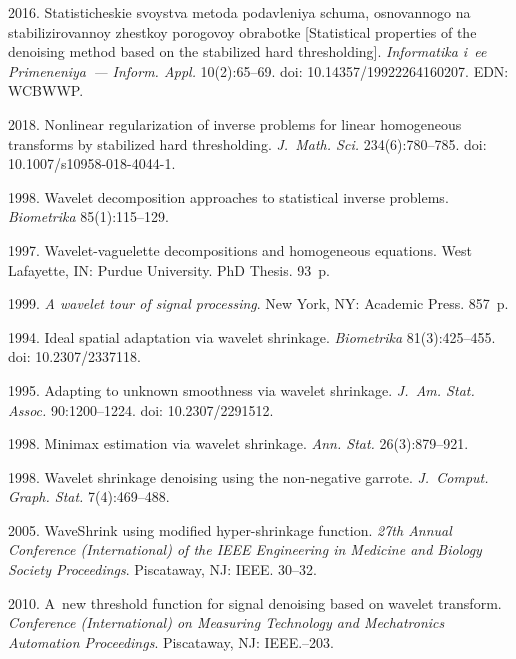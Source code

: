 \begin{multicols}{2}
{{\begin{thebibliography}{99}
 2016. Statisticheskie svoystva metoda podavleniya schuma, osnovannogo na stabilizirovannoy zhest\-koy porogovoy obrabotke 
 [Statistical properties of the denoising method based on the stabilized hard thresholding]. 
 \textit{Informatika i~ee Primeneniya~--- Inform. Appl.} 10(2):65--69. 
doi: 10.14357/19922264160207. EDN: WCBWWP.

 2018. Nonlinear regularization of inverse problems for linear homogeneous transforms by stabilized hard thresholding. 
 \textit{J.~Math. Sci.} 234(6):780--785. doi: 10.1007/s10958-018-4044-1.

 1998. Wavelet decomposition approaches to statistical inverse problems. \textit{Biometrika} 85(1):115--129.

 1997. Wavelet-vaguelette decompositions and homogeneous equations.  West Lafayette, IN: Purdue University. PhD Thesis. 93~p.

 1999. \textit{A wavelet tour of signal processing}. New York, NY: Academic Press. 857~p.

 1994. Ideal spatial adaptation via wavelet shrinkage. \textit{Biometrika} 81(3):425--455. doi: 10.2307/2337118.

 1995. Adapting to unknown smoothness via wavelet shrinkage. \textit{J.~Am. Stat. Assoc.} 90:1200--1224. 
doi: 10.2307/2291512.

 1998. Minimax estimation via wavelet shrinkage. \textit{Ann. Stat.} 26(3):879--921.

 1998. Wavelet shrinkage denoising using the non-negative garrote. \textit{J.~Comput. Graph. Stat.} 7(4):469--488.

 2005. WaveShrink using modified hyper-shrinkage function. \textit{27th Annual Conference (International) 
 of the IEEE Engineering in Medicine and Biology Society Proceedings}. Piscataway, NJ: IEEE. 30--32.

 2010. A~new threshold function for signal denoising based on wavelet transform. 
\textit{Conference (International) on Measuring Technology and Mechatronics Automation Proceedings}. Piscataway, NJ: IEEE.--203.


\end{thebibliography}}}
\end{multicols}

